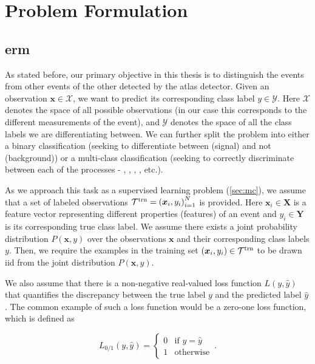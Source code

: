 \section{Problem Formulation}
\label{sec:formulation}

\subsection[Empirical Risk Minimization]{\gls{erm}}

As stated before, our primary objective in this thesis is to distinguish the \tth events from other events of the other
detected by the \gls{atlas} detector. Given an observation $\bm{x} \in \mathcal{X}$, we want to predict its
corresponding class label $y \in \mathcal{Y}$. Here $\mathcal{X}$ denotes the space of all possible observations (in
our case this corresponds to the different measurements of the event), and $\mathcal{Y}$ denotes the space of all
the class labels we are differentiating between. We can further split the problem into either a binary classification
(seeking to differentiate between \tth (signal) and not \tth (background)) or a multi-class classification (seeking to
correctly discriminate between each of the processes - \tth, \ttw, \ttz, \ttbar, etc.).

As we approach this task as a supervised learning problem (\autoref{sec:mc}), we assume that a set of labeled
observations $\mathcal{T}^\text{trn} = {(\bm{x}_i, y_i)}_{i=1}^N$ is provided.  Here $\bm{x}_i \in \mathbf{X}$ is a feature vector
representing different properties (features) of an event and $y_i \in \mathbf{Y}$ is its corresponding true class label.
We assume there exists a joint probability distribution $P(\bm{x}, y)$ over the observations $\bm{x}$ and their
corresponding class labels $y$. Then, we require the examples in the training set $(\bm{x}_i, y_i) \in \mathcal{T}^\text{trn}$ to be
drawn \gls{iid} from the joint distribution $P(\bm{x}, y)$.


We also assume that there is a non-negative real-valued loss function $L(y, \hat{y})$ that quantifies the
discrepancy between the true label $y$ and the predicted label $\hat{y}$. The common example of such a loss function
would be a zero-one loss function, which is defined as

\begin{equation}
    L_{0/1}(y, \hat{y}) = \begin{cases}
        0 & \text{if } y = \hat{y} \\
        1 & \text{otherwise}
    \end{cases}\,.
\end{equation}

